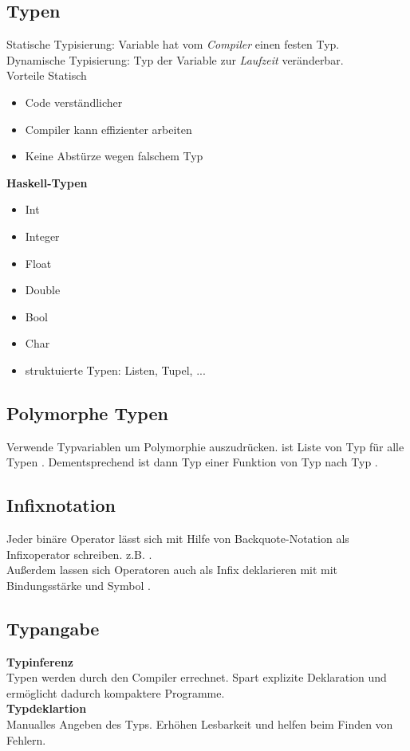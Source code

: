         \subsection{Typen}
        Statische Typisierung: Variable hat vom \textit{Compiler} einen festen Typ.\\
        Dynamische Typisierung: Typ der Variable zur \textit{Laufzeit} veränderbar.\\
        Vorteile Statisch
        \begin{itemize}
          \item Code verständlicher
          \item Compiler kann effizienter arbeiten
          \item Keine Abstürze wegen falschem Typ
        \end{itemize}
        \textbf{Haskell-Typen}
        \begin{itemize}
          \item Int
          \item Integer
          \item Float
          \item Double
          \item Bool
          \item Char
          \item struktuierte Typen: Listen, Tupel, ...
        \end{itemize}

        \subsection{Polymorphe Typen}
        Verwende Typvariablen um Polymorphie auszudrücken.
        \code{[t]} ist Liste von Typ  für alle Typen .
        Dementsprechend ist dann  Typ einer Funktion von Typ  nach Typ .

        \subsection{Infixnotation}
        Jeder binäre Operator lässt sich mit Hilfe von Backquote-Notation als Infixoperator schreiben.
        z.B. .\\
        Außerdem lassen sich Operatoren auch als Infix deklarieren mit  mit Bindungsstärke  und Symbol .

        \subsection{Typangabe}
        \textbf{Typinferenz}\\
        Typen werden durch den Compiler errechnet. Spart explizite Deklaration und ermöglicht dadurch kompaktere Programme.\\
        \textbf{Typdeklartion}\\
        Manualles Angeben des Typs. Erhöhen Lesbarkeit und helfen beim Finden von Fehlern.

